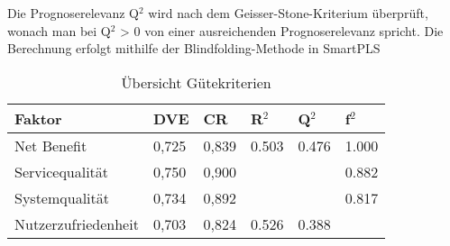 Die Prognoserelevanz Q$^2$ wird nach dem Geisser-Stone-Kriterium überprüft, wonach man bei Q$^2$ > 0 von einer ausreichenden Prognoserelevanz spricht. Die Berechnung erfolgt mithilfe der Blindfolding-Methode in SmartPLS
 




\begin{table}[h] 
\caption{Übersicht Gütekriterien}
\label{tab:Übersicht Gütekriterien} 
\begin{tabular}{@{}llllll@{}} \toprule

\textbf{Faktor} & \textbf{DVE} & \textbf{CR} & \textbf{R$^2$} & \textbf{Q$^2$} & \textbf{f$^2$} \\ \midrule

 Net Benefit 		& 0,725 		& 0,839 & 0.503 & 0.476 		& 1.000 \\
 
 Servicequalität 	& 0,750 		& 0,900 & 		& 			& 0.882 \\

 Systemqualität 	& 0,734 		& 0,892 & 		& 			& 0.817 \\

 Nutzerzufriedenheit & 0,703 	& 0,824 			& 0.526 		& 0.388 	 \\ \bottomrule
\end{tabular}	
\end{table}











